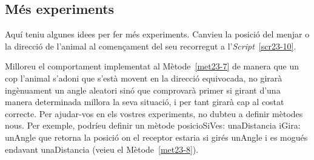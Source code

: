 \newpage
{}

\subsection{Més experiments}
Aquí teniu algunes idees per fer més experiments. Canvieu la posició del menjar o la direcció de l'animal al començament del seu recorregut a l'\emph{Script}~\ref{scr23-10}.

Milloreu el comportament implementat al Mètode~\ref{met23-7} de manera que un cop l'animal s'adoni que s'està movent en la direcció equivocada, no girarà ingènuament un angle aleatori sinó que comprovarà primer si girant d'una manera determinada millora la seva situació, i per tant girarà cap al costat correcte.
Per ajudar-vos en els vostres experiments, no dubteu a definir mètodes nous. Per exemple, podríeu definir un mètode \textsf{posicioSiVes: unaDistancia iGira: unAngle} que retorna la posició on el receptor estaria si girés \textsf{unAngle} i es mogués endavant \textsf{unaDistancia} (veieu el Mètode~\ref{met23-8}).

